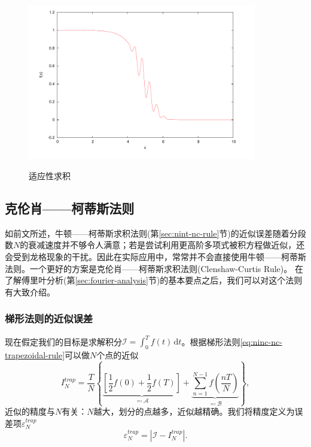 \begin{figure}[htbp]
   \caption{适应性求积}
  \centering
  \includegraphics[width=10cm]{./Figures/20170227-nc-adaptive-quadrature.png}
  \label{fig:ninc-nc-singularity-adaptive-quadrature}
%
\end{figure}

\subsection{克伦肖——柯蒂斯法则}
\label{sec:ninc-cc-rules}

如前文所述，牛顿——柯蒂斯求积法则(第\ref{sec:nint-nc-rule}节)的近似误差随着分段数$N$的衰减速度并不够令人满意；若是尝试利用更高阶多项式被积方程做近似，还会受到龙格现象的干扰。因此在实际应用中，常常并不会直接使用牛顿——柯蒂斯法则。一个更好的方案是克伦肖——柯蒂斯求积法则(Clenshaw-Curtis Rule)。
在了解傅里叶分析(第\ref{sec:fourier-analysis}节)的基本要点之后，我们可以对这个法则有大致介绍。


\subsubsection{梯形法则的近似误差}
\label{sec:ninc-cc-trapezoidal-error}
现在假定我们的目标是求解积分$\mathcal{I} = \int_{0}^{T} f(t) \, \mathrm{d} t$。根据梯形法则\eqref{eq:ninc-nc-trapezoidal-rule}可以做$N$个点的近似
\begin{equation}
  \label{eq:ninc-cc-trape-approx}
  I_{N}^{trap} = \frac{T}{N}
  \left\{
  \underbrace{
  \left[ \frac{1}{2} f(0) + \frac{1}{2} f(T) \right]
  }_{\eqqcolon \mathcal{A}}
  + \underbrace{
  \sum_{n=1}^{N-1} f \left( \frac{n T}{N} \right)
  }_{\eqqcolon \mathcal{B}}
  \right\},
\end{equation}
近似的精度与$N$有关：$N$越大，划分的点越多，近似越精确。我们将精度定义为误差项$\varepsilon_{N}^{trap}$
\begin{equation*}
  \varepsilon_{N}^{trap} = \left| \mathcal{I} - I_{N}^{trap} \right|.
\end{equation*}

